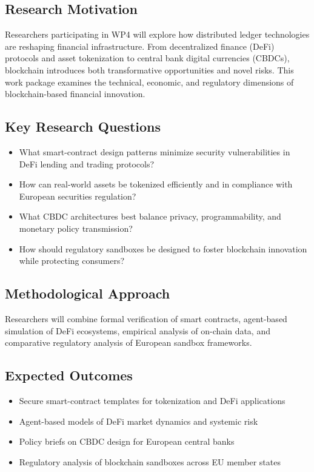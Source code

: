 \subsection*{Research Motivation}

Researchers participating in WP4 will explore how distributed ledger
technologies are reshaping financial infrastructure.  From decentralized
finance (DeFi) protocols and asset tokenization to central bank digital
currencies (CBDCs), blockchain introduces both transformative opportunities and
novel risks.  This work package examines the technical, economic, and regulatory
dimensions of blockchain-based financial innovation.

\subsection*{Key Research Questions}
\begin{itemize}[nosep]
  \item What smart-contract design patterns minimize security vulnerabilities in
        DeFi lending and trading protocols?
  \item How can real-world assets be tokenized efficiently and in compliance with
        European securities regulation?
  \item What CBDC architectures best balance privacy, programmability, and
        monetary policy transmission?
  \item How should regulatory sandboxes be designed to foster blockchain
        innovation while protecting consumers?
\end{itemize}

\subsection*{Methodological Approach}

Researchers will combine formal verification of smart contracts, agent-based
simulation of DeFi ecosystems, empirical analysis of on-chain data, and
comparative regulatory analysis of European sandbox frameworks.

\subsection*{Expected Outcomes}
\begin{itemize}[nosep]
  \item Secure smart-contract templates for tokenization and DeFi applications
  \item Agent-based models of DeFi market dynamics and systemic risk
  \item Policy briefs on CBDC design for European central banks
  \item Regulatory analysis of blockchain sandboxes across EU member states
\end{itemize}


